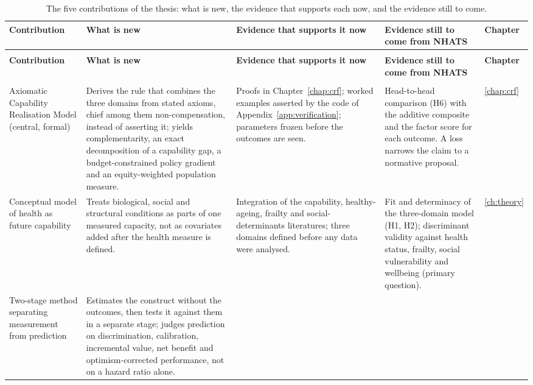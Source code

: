 {\footnotesize
\renewcommand{\arraystretch}{1.2}
\begin{longtable}{>{\raggedright\arraybackslash}p{2.2cm} >{\raggedright\arraybackslash}p{3.4cm} >{\raggedright\arraybackslash}p{3.2cm} >{\raggedright\arraybackslash}p{3.2cm} >{\raggedright\arraybackslash}p{1.3cm}}
\caption{The five contributions of the thesis: what is new, the evidence that supports each now, and the evidence still to come.}\label{tab:conc-contrib}\\
\toprule
\textbf{Contribution} & \textbf{What is new} & \textbf{Evidence that supports it now} & \textbf{Evidence still to come from NHATS} & \textbf{Chapter} \\
\midrule
\endfirsthead
\multicolumn{5}{@{}l}{\textit{Continued from the previous page}}\\
\toprule
\textbf{Contribution} & \textbf{What is new} & \textbf{Evidence that supports it now} & \textbf{Evidence still to come from NHATS} & \textbf{Chapter} \\
\midrule
\endhead
\midrule
\multicolumn{5}{@{}r}{\textit{Continued on the next page}}\\
\endfoot
\endlastfoot
Axiomatic Capability Realisation Model (central, formal)
 & Derives the rule that combines the three domains from stated axioms, chief among them non-compensation, instead of asserting it; yields complementarity, an exact decomposition of a capability gap, a budget-constrained policy gradient and an equity-weighted population measure.
 & Proofs in Chapter~\ref{chap:crf}; worked examples asserted by the code of Appendix~\ref{app:verification}; parameters frozen before the outcomes are seen.
 & Head-to-head comparison (H6) with the additive composite and the factor score for each outcome. A loss narrows the claim to a normative proposal.
 & \ref{chap:crf} \\
Conceptual model of health as future capability
 & Treats biological, social and structural conditions as parts of one measured capacity, not as covariates added after the health measure is defined.
 & Integration of the capability, healthy-ageing, frailty and social-determinants literatures; three domains defined before any data were analysed.
 & Fit and determinacy of the three-domain model (H1, H2); discriminant validity against health status, frailty, social vulnerability and wellbeing (primary question).
 & \ref{ch:theory} \\
Two-stage method separating measurement from prediction
 & Estimates the construct without the outcomes, then tests it against them in a separate stage; judges prediction on discrimination, calibration, incremental value, net benefit and optimism-corrected performance, not on a hazard ratio alone.

\end{longtable}}
